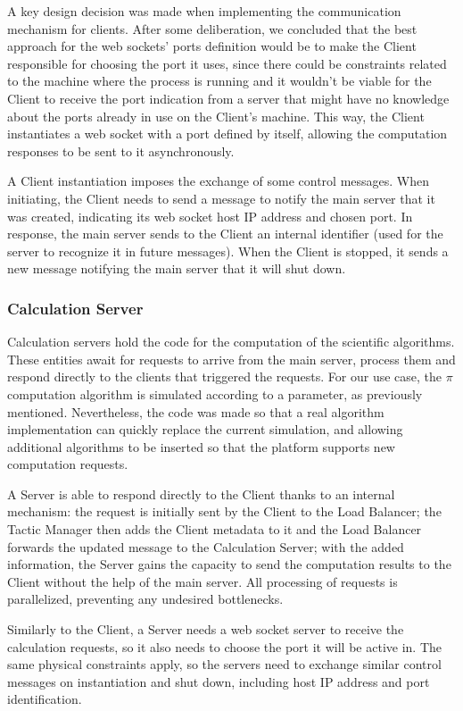\documentclass[12pt]{article}
\begin{document}
A key design decision was made when implementing the communication mechanism for clients.
After some deliberation, we concluded that the best approach for the web sockets' ports definition would be to make the Client responsible for choosing the port
it uses, since there could be constraints related to the machine where the process is running and it wouldn't be viable for the Client to receive the port 
indication from a server that might have no knowledge about the ports already in use on the Client's machine. 
This way, the Client instantiates a web socket with a port defined by itself, allowing the computation responses to be sent to it asynchronously.

A Client instantiation imposes the exchange of some control messages.
When initiating, the Client needs to send a message to notify the main server that it was created, indicating its web socket host IP address and chosen port.
In response, the main server sends to the Client an internal identifier (used for the server to recognize it in future messages).
When the Client is stopped, it sends a new message notifying the main server that it will shut down. 

\subsubsection{Calculation Server}

Calculation servers hold the code for the computation of the scientific algorithms.
These entities await for requests to arrive from the main server, process them and respond directly to the clients that triggered the requests.
For our use case, the $\pi$ computation algorithm is simulated according to a parameter, as previously mentioned.
Nevertheless, the code was made so that a real algorithm implementation can quickly replace the current simulation, and allowing additional algorithms to be 
inserted so that the platform supports new computation requests.

A Server is able to respond directly to the Client thanks to an internal mechanism:
the request is initially sent by the Client to the Load Balancer;
the Tactic Manager then adds the Client metadata to it and the Load Balancer forwards the updated message to the Calculation Server;
with the added information, the Server gains the capacity to send the computation results to the Client without the help of the main server.
All processing of requests is parallelized, preventing any undesired bottlenecks.

Similarly to the Client, a Server needs a web socket server to receive the calculation requests, so it also needs to choose the port it will be active in. 
The same physical constraints apply, so the servers need to exchange similar control messages on instantiation and shut down, including host IP address and port identification.
\end{document}
